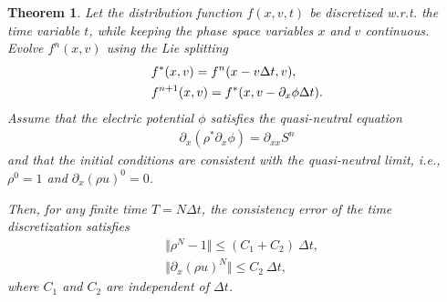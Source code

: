\documentclass[letterpaper,10pt]{article}
\newtheorem{theorem}{Theorem}[section]
\numberwithin{equation}{section}
\numberwithin{figure}{section}
\numberwithin{table}{section}
\begin{document}
\begin{theorem}\label{theorem:consistency}
Let the distribution function $f(x,v,t)$ be discretized w.r.t. the time variable $t$, while keeping the phase space variables $x$ and $v$ continuous. Evolve $f^n(x,v)$ using the Lie splitting 
\begin{align}\label{SLsemischeme}
    &f^*(x,v)=f^n(x-v\Delta t,v),\notag\\
    &f^{n+1}(x,v)=f^*(x,v-\partial_x\phi\Delta t).
\end{align}
Assume that the electric potential $\phi$ 
satisfies the quasi-neutral equation
\begin{align*}
    \partial_x(\rho^*\partial_x\phi)=\partial_{xx}S^n
\end{align*}
and that the initial conditions are consistent with the quasi-neutral limit, i.e., $\rho^0=1$ and $\partial_x(\rho u)^0=0$.

Then, for any finite time $T=N\Delta t$, the consistency error of the
time discretization satisfies
\begin{align*}
    &\Vert \rho^N - 1\Vert \leq (C_1+C_2)~\Delta t,\\
    &\Vert \partial_x(\rho u)^N\Vert \leq C_2~\Delta t,
\end{align*}
where $C_1$ and $C_2$ are independent of $\Delta t$.
\end{theorem}
\end{document}
